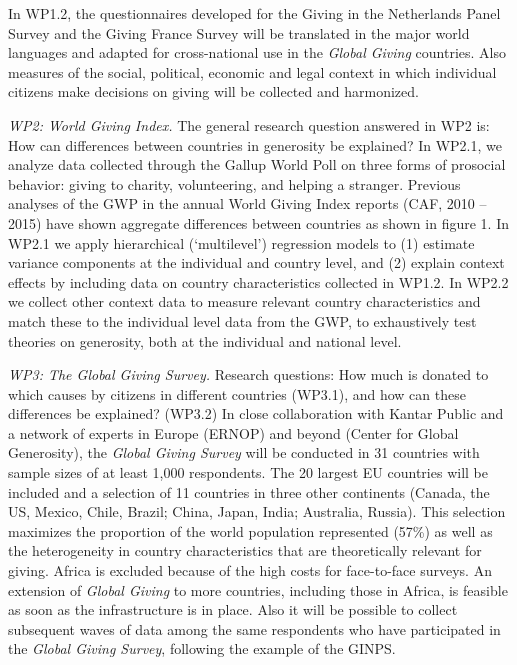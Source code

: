 \documentclass[twocolumn, serif, rga, numeric]{jote-article}
\begin{document}
In WP1.2, the questionnaires developed for the Giving in the Netherlands Panel Survey and the Giving France Survey will be translated in the major world languages and adapted for cross-national use in the \emph{Global Giving} countries. Also measures of the social, political, economic and legal context\cite{Dehne2008, Quick2014} in which individual citizens make decisions on giving will be collected and harmonized.

\emph{WP2: World Giving Index.} The general research question answered in WP2 is: How can differences between countries in generosity be explained? In WP2.1, we analyze data collected through the Gallup World Poll on three forms of prosocial behavior: giving to charity, volunteering, and helping a stranger. Previous analyses of the GWP in the annual World Giving Index reports (CAF, 2010 -- 2015) have shown aggregate differences between countries as shown in figure 1. In WP2.1 we apply hierarchical (`multilevel') regression models to (1) estimate variance components at the individual and country level, and (2) explain context effects by including data on country characteristics collected in WP1.2. In WP2.2 we collect other context data to measure relevant country characteristics and match these to the individual level data from the GWP, to exhaustively test theories on generosity, both at the individual and national level.

\emph{WP3: The Global Giving Survey.} Research questions: How much is donated to which causes by citizens in different countries (WP3.1), and how can these differences be explained? (WP3.2) In close collaboration with Kantar Public and a network of experts in Europe (ERNOP) and beyond (Center for Global Generosity), the \emph{Global Giving Survey} will be conducted in 31 countries with sample sizes of at least 1,000 respondents. The 20 largest EU countries will be included and a selection of 11 countries in three other continents (Canada, the US, Mexico, Chile, Brazil; China, Japan, India; Australia, Russia). This selection maximizes the proportion of the world population represented (57\%) as well as the heterogeneity in country characteristics that are theoretically relevant for giving.\cite{Falk2018} Africa is excluded because of the high costs for face-to-face surveys. An extension of \emph{Global Giving} to more countries, including those in Africa, is feasible as soon as the infrastructure is in place. Also it will be possible to collect subsequent waves of data among the same respondents who have participated in the \emph{Global Giving Survey}, following the example of the GINPS.
\end{document}
